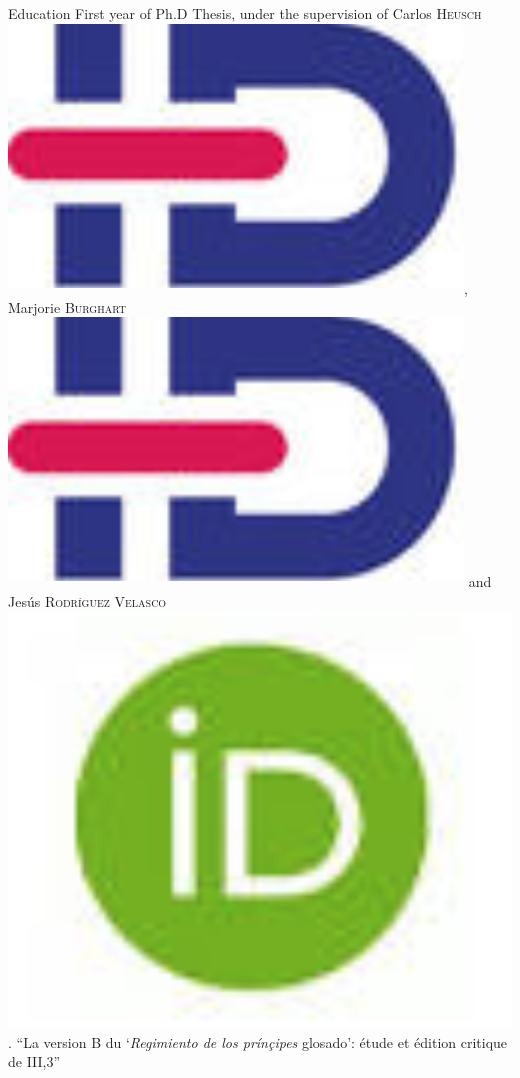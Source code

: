  \begin{rubric}{Education}
                                \entry*[2018-2019]
                            First year of Ph.D Thesis, under the supervision of Carlos \textsc{Heusch}\href{https://www.idref.fr/055838413}{\textsuperscript{\includegraphics[scale=0.025]{img/idref.png}}}, Marjorie \textsc{Burghart}\href{https://www.idref.fr/178995819}{\textsuperscript{\includegraphics[scale=0.025]{img/idref.png}}} and Jesús \textsc{Rodríguez Velasco}\href{https://orcid.org/0000-0002-3848-9230}{\includegraphics[scale=0.025]{img/orcid.png}}. \enquote{La version B du
                        \enquote{\textit{Regimiento de los prínçipes} glosado}: étude et
                        édition critique de III,3}
                    

\end{rubric}
